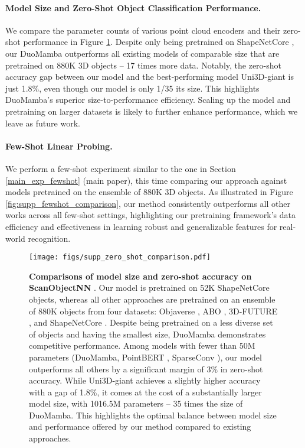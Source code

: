 \paragraph{Model Size and Zero-Shot Object Classification Performance.} We compare the parameter counts of various point cloud encoders and their zero-shot performance in Figure \ref{fig:supp_zeroshot_comparison}. Despite only being pretrained on ShapeNetCore \cite{shapenet}, our DuoMamba outperforms all existing models of comparable size that are pretrained on 880K 3D objects -- 17 times more data. Notably, the zero-shot accuracy gap between our model and the best-performing model Uni3D-giant \cite{uni3d} is just 1.8\%, even though our model is only 1/35 its size. This highlights DuoMamba's superior size-to-performance efficiency. Scaling up the model and pretraining on larger datasets is likely to further enhance performance, which we leave as future work.

\vspace{-5mm}
\paragraph{Few-Shot Linear Probing.} We perform a few-shot experiment similar to the one in Section \ref{main_exp_fewshot} 
(main paper), this time comparing our approach against models pretrained on the ensemble of 880K 3D objects. As illustrated in Figure \ref{fig:supp_fewshot_comparison}, our method consistently outperforms all other works across all few-shot settings, highlighting our pretraining framework's data efficiency and effectiveness in learning robust and generalizable features for real-world recognition.
\begin{figure}[!h]
    \centering
    \texttt{[image: figs/supp\_zero\_shot\_comparison.pdf]}
    \vspace{-3mm}
    \caption{\textbf{Comparisons of model size and zero-shot accuracy on ScanObjectNN} \cite{scanobjectnn}.
    Our model is pretrained on 52K ShapeNetCore \cite{shapenet} objects, whereas all other approaches are pretrained on an ensemble of 880K objects from four datasets: Objaverse \cite{objaverse}, ABO \cite{abo}, 3D-FUTURE \cite{3dfuture}, and ShapeNetCore \cite{shapenet}. Despite being pretrained on a less diverse set of objects and having the smallest size, DuoMamba demonstrates competitive performance. Among models with fewer than 50M parameters (DuoMamba, PointBERT \cite{pointbert}, SparseConv \cite{sparseconv}), our model outperforms all others by a significant margin of 3\% in zero-shot accuracy. While Uni3D-giant \cite{uni3d} achieves a slightly higher accuracy with a gap of 1.8\%, it comes at the cost of a substantially larger model size, with 1016.5M parameters -- 35 times the size of DuoMamba. This highlights the optimal balance between model size and performance offered by our method compared to existing approaches.}    
    \label{fig:supp_zeroshot_comparison}
\end{figure}

